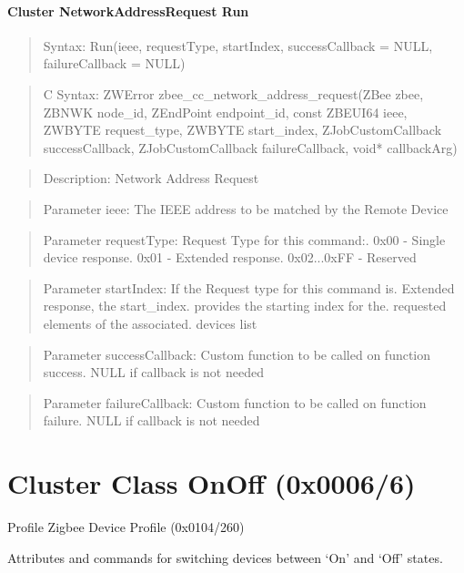 \paragraph{Cluster NetworkAddressRequest Run}
\begin{quote}Syntax: Run(ieee, requestType, startIndex, successCallback = NULL, failureCallback = NULL)\end{quote}
\begin{quote}C Syntax: ZWError zbee\_cc\_network\_address\_request(ZBee zbee, ZBNWK node\_id, ZEndPoint endpoint\_id, const ZBEUI64 ieee, ZWBYTE request\_type, ZWBYTE start\_index, ZJobCustomCallback successCallback, ZJobCustomCallback failureCallback, void* callbackArg)\end{quote}
\begin{quote}Description: Network Address Request\end{quote}
\begin{quote}Parameter ieee: The IEEE address to be matched by the Remote Device\end{quote}
\begin{quote}Parameter requestType: Request Type for this command:. 0x00        - Single device response. 0x01        - Extended response. 0x02...0xFF - Reserved\end{quote}
\begin{quote}Parameter startIndex: If the Request type for this command is. Extended response, the start\_index. provides the starting index for the. requested elements of the associated. devices list\end{quote}
\begin{quote}Parameter successCallback: Custom function to be called on function success. NULL if callback is not needed\end{quote}
\begin{quote}Parameter failureCallback: Custom function to be called on function failure. NULL if callback is not needed\end{quote}



\section{Cluster Class OnOff (0x0006/6)}

Profile Zigbee Device Profile (0x0104/260)

Attributes and commands for switching devices between ‘On’ and ‘Off’ states.
\newline


